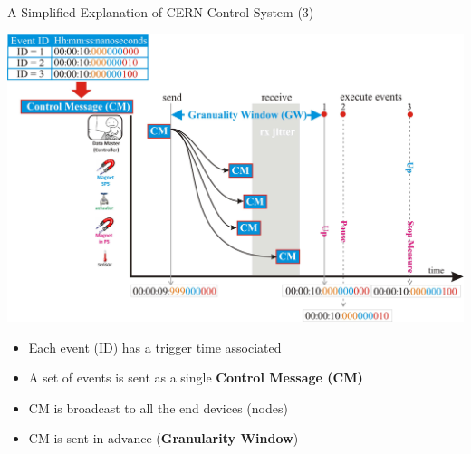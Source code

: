\documentclass[compress,red]{beamer}
\begin{document}
\begin{frame}{A Simplified Explanation of CERN Control System (3)}

      \begin{center}
      \includegraphics[width=.8\textwidth]{applications/CERN/event3.pdf}
      \end{center}

  \begin{itemize}
    \item Each event (ID) has a trigger time associated
	\item A set of events is sent as a single {\bf Control Message (CM)}
	\item CM is broadcast to all the end devices (nodes)
	\item CM is sent in advance ({\bf Granularity Window})
  \end{itemize}

\end{frame}
\end{document}
